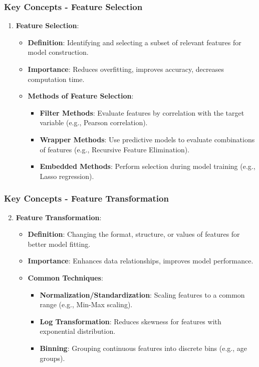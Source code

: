 \documentclass[aspectratio=169]{beamer}
\begin{document}
\begin{frame}[fragile]
    \frametitle{Key Concepts - Feature Selection}
    \begin{enumerate}
        \item \textbf{Feature Selection}:
        \begin{itemize}
            \item \textbf{Definition}: Identifying and selecting a subset of relevant features for model construction.
            \item \textbf{Importance}: Reduces overfitting, improves accuracy, decreases computation time.
            \item \textbf{Methods of Feature Selection}:
                \begin{itemize}
                    \item \textbf{Filter Methods}: Evaluate features by correlation with the target variable (e.g., Pearson correlation).
                    \item \textbf{Wrapper Methods}: Use predictive models to evaluate combinations of features (e.g., Recursive Feature Elimination).
                    \item \textbf{Embedded Methods}: Perform selection during model training (e.g., Lasso regression).
                \end{itemize}
        \end{itemize}
    \end{enumerate}
\end{frame}

\begin{frame}[fragile]
    \frametitle{Key Concepts - Feature Transformation}
    \begin{enumerate}
        \setcounter{enumi}{1}
        \item \textbf{Feature Transformation}:
        \begin{itemize}
            \item \textbf{Definition}: Changing the format, structure, or values of features for better model fitting.
            \item \textbf{Importance}: Enhances data relationships, improves model performance.
            \item \textbf{Common Techniques}:
                \begin{itemize}
                    \item \textbf{Normalization/Standardization}: Scaling features to a common range (e.g., Min-Max scaling).
                    \item \textbf{Log Transformation}: Reduces skewness for features with exponential distribution.
                    \item \textbf{Binning}: Grouping continuous features into discrete bins (e.g., age groups).
                \end{itemize}
        \end{itemize}
    \end{enumerate}
\end{frame}
\end{document}
